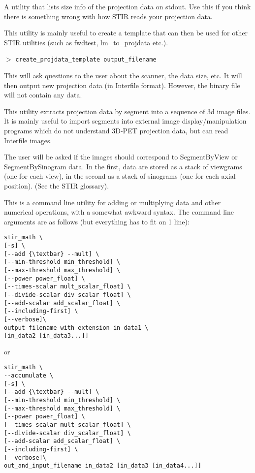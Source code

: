 \documentclass{article}
\newcommand{\cmdline}[1]{\par \noindent $>$ \texttt{#1}\par}
\begin{document}
{ 
}

A utility that lists size info of the projection data on stdout. 
Use this if you think there is something wrong with how STIR 
reads your projection data.

{ 
}

This utility is mainly useful to create a template that can then 
be used for other STIR utilities (such as fwdtest, lm\_to\_projdata 
etc.).
\cmdline{create\_projdata\_template output\_filename}

This will ask questions to the user about the scanner, the data 
size, etc. It will then output new projection data (in Interfile 
format). However, the binary file will not contain any data.

{ 
}

This utility extracts projection data by segment into a sequence 
of 3d image files. It is mainly useful to import segments into 
external image display/manipulation programs which do not understand 
3D-PET projection data, but can read Interfile images.


The user will be asked if the images should correspond to SegmentByView 
or SegmentBySinogram data. In the first, data are stored as a 
stack of viewgrams (one for each view), in the second as a stack 
of sinograms (one for each axial position). (See the STIR glossary).

{ 
}
\label{sec:stir_math}

This is a command line utility for adding or multiplying data 
and other numerical operations, with a somewhat awkward syntax. 
The command line arguments are as follows (but everything has 
to fit on 1 line):
\begin{verbatim}
stir_math \
[-s] \
[--add {\textbar} --mult] \
[--min-threshold min_threshold] \
[--max-threshold max_threshold] \
[--power power_float] \
[--times-scalar mult_scalar_float] \
[--divide-scalar div_scalar_float] \
[--add-scalar add_scalar_float] \
[--including-first] \
[--verbose]\
output_filename_with_extension in_data1 \
[in_data2 [in_data3...]]
\end{verbatim}

or

\begin{verbatim}
stir_math \
--accumulate \
[-s] \
[--add {\textbar} --mult] \
[--min-threshold min_threshold] \
[--max-threshold max_threshold] \
[--power power_float] \
[--times-scalar mult_scalar_float] \
[--divide-scalar div_scalar_float] \
[--add-scalar add_scalar_float] \
[--including-first] \
[--verbose]\
out_and_input_filename in_data2 [in_data3 [in_data4...]]
\end{verbatim}
\end{document}
